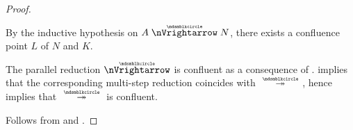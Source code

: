 \begin{proof}
\begin{itemize}
\begin{itemize}
      By the inductive hypothesis on \( A \ppred N \), there exists a confluence point \( L \) of \( N \) and \( K \).
    \end{itemize}
  \end{itemize}

   The parallel reduction \( {\ppred} \) is confluent as a consequence of .  implies that the corresponding multi-step reduction coincides with \( {\pred*} \), hence  implies that \( {\pred*} \) is confluent.

   Follows from  and .
\end{proof}
